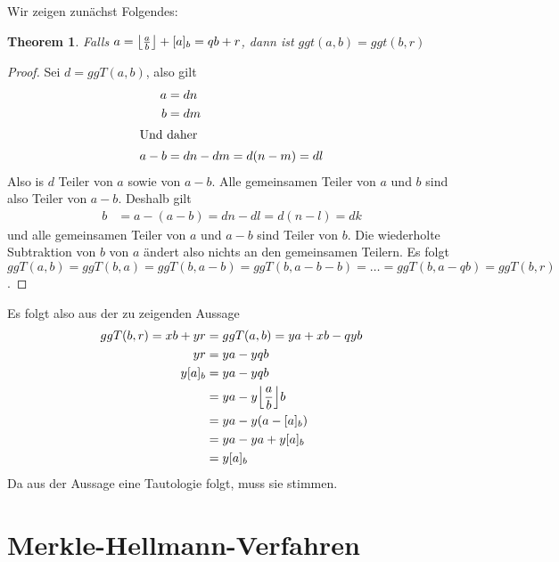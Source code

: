 \documentclass{../crypto}
\newtheorem{theorem}{Theorem}
\begin{document}
Wir zeigen zunächst Folgendes:

\begin{theorem}
Falls $a = \floor*{\frac{a}{b}} + [a]_b = qb + r$, dann
   ist $ggt(a,b) = ggt(b,r)$
\end{theorem}
\begin{proof}
   Sei $d=ggT(a,b)$, also gilt
   \begin{align*}
      a & = dn \\
      b & = dm \\
      \intertext{Und daher}
      a - b & = dn - dm  = d(n-m) = dl
   \end{align*}
   Also is $d$ Teiler von $a$ sowie von $a-b$. Alle gemeinsamen Teiler von $a$
   und $b$ sind also Teiler von $a-b$. Deshalb gilt
   \begin{align*}
      b & = a - (a - b) = dn - dl = d(n - l) = dk
   \end{align*}
   und alle gemeinsamen Teiler von $a$ und $a-b$ sind Teiler von $b$. Die
   wiederholte Subtraktion von $b$ von $a$ ändert also nichts an den gemeinsamen
   Teilern. Es folgt $ggT(a,b) = ggT(b,a) = ggT(b, a - b) = ggT(b, a - b - b) =
   \ldots = ggT(b, a - qb) = ggT(b,r)$.
\end{proof}

Es folgt also aus der zu zeigenden Aussage
\begin{align*}
   ggT(b,r) = xb + yr & = ggT(a,b) = ya + xb - qyb \\
            yr & = ya - yqb \\
            y [a]_b & = ya - yqb \\
                    & = ya -y \floor*{\frac{a}{b}} b \\
                    & = ya - y(a - [a]_b) \\
                    & = ya - ya + y [a]_b \\
                    & = y [a]_b
\end{align*}
Da aus der Aussage eine Tautologie folgt, muss sie stimmen.

\subsection{}


\section{Merkle-Hellmann-Verfahren}

\subsection{}
\end{document}
